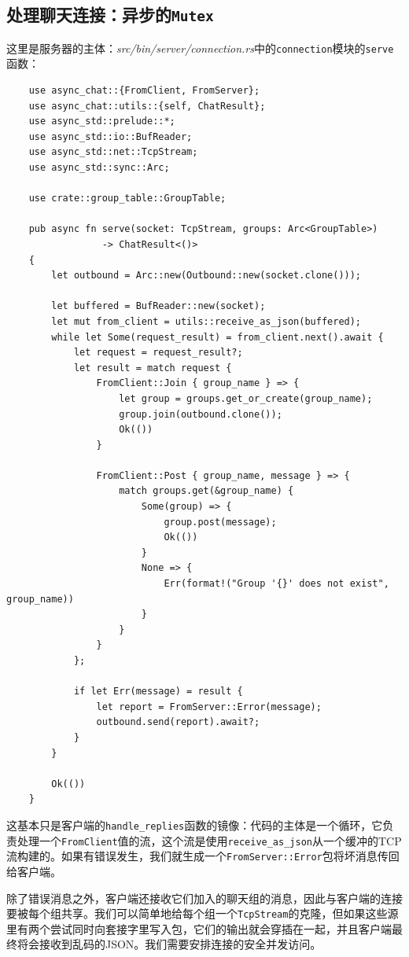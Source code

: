 \subsection{处理聊天连接：异步的\texttt{Mutex}}
这里是服务器的主体：\emph{src/bin/server/connection.rs}中的\texttt{connection}模块的\texttt{serve}函数：
\begin{verbatim}
    use async_chat::{FromClient, FromServer};
    use async_chat::utils::{self, ChatResult};
    use async_std::prelude::*;
    use async_std::io::BufReader;
    use async_std::net::TcpStream;
    use async_std::sync::Arc;

    use crate::group_table::GroupTable;

    pub async fn serve(socket: TcpStream, groups: Arc<GroupTable>)
                 -> ChatResult<()>
    {
        let outbound = Arc::new(Outbound::new(socket.clone()));

        let buffered = BufReader::new(socket);
        let mut from_client = utils::receive_as_json(buffered);
        while let Some(request_result) = from_client.next().await {
            let request = request_result?;
            let result = match request {
                FromClient::Join { group_name } => {
                    let group = groups.get_or_create(group_name);
                    group.join(outbound.clone());
                    Ok(())
                }

                FromClient::Post { group_name, message } => {
                    match groups.get(&group_name) {
                        Some(group) => {
                            group.post(message);
                            Ok(())
                        }
                        None => {
                            Err(format!("Group '{}' does not exist", group_name))
                        }
                    }
                }
            };

            if let Err(message) = result {
                let report = FromServer::Error(message);
                outbound.send(report).await?;
            }
        }

        Ok(())
    }
\end{verbatim}

这基本只是客户端的\texttt{handle\_replies}函数的镜像：代码的主体是一个循环，它负责处理一个\texttt{FromClient}值的流，这个流是使用\texttt{receive\_as\_json}从一个缓冲的TCP流构建的。如果有错误发生，我们就生成一个\texttt{FromServer::Error}包将坏消息传回给客户端。

除了错误消息之外，客户端还接收它们加入的聊天组的消息，因此与客户端的连接要被每个组共享。我们可以简单地给每个组一个\texttt{TcpStream}的克隆，但如果这些源里有两个尝试同时向套接字里写入包，它们的输出就会穿插在一起，并且客户端最终将会接收到乱码的JSON。我们需要安排连接的安全并发访问。

